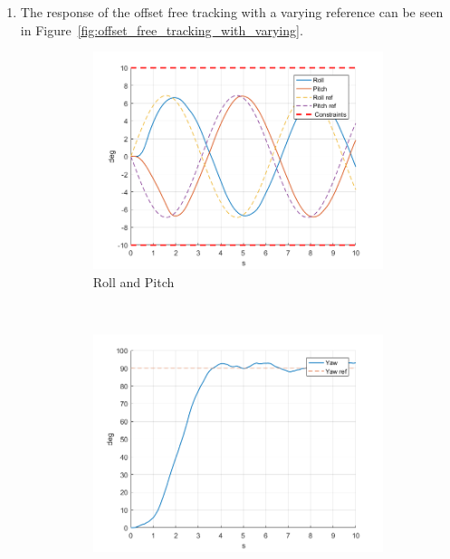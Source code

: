 \documentclass[11pt]{article}
\begin{document}
\begin{enumerate}
    \item The response of the offset free tracking with a varying reference can be
    seen in Figure~\ref{fig:offset_free_tracking_with_varying}.
    \begin{figure}[ht]
        \centering
        \begin{subfigure}[c]{0.3\linewidth}
            \centering
            \includegraphics[width=\linewidth]{Plots_10_OffsetFreeTracking_Varying/01}
            \caption{Roll and Pitch}
        \end{subfigure}
        ~
        \begin{subfigure}[c]{0.3\linewidth}
            \centering
            \includegraphics[width=\linewidth]{Plots_10_OffsetFreeTracking_Varying/02}

\end{subfigure}
\end{figure}
\end{enumerate}
\end{document}
